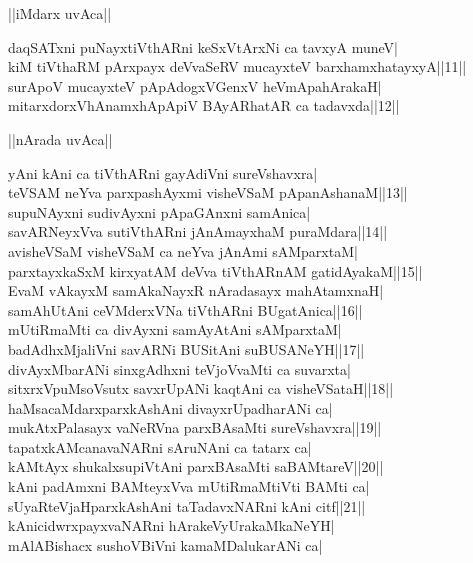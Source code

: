 \documentclass{article}
\begin{document}
\begin{center}
||iMdarx uvAca||
\end{center}

daqSATxni puNayxtiVthARni keSxVtArxNi ca tavxyA muneV|\\
kiM tiVthaRM pArxpayx deVvaSeRV mucayxteV barxhamxhatayxyA||11||\\
surApoV mucayxteV pApAdogxVGenxV heVmApahArakaH|\\
mitarxdorxVhAnamxhApApiV BAyARhatAR ca tadavxda||12||\\

\begin{center}
||nArada uvAca||
\end{center}

yAni kAni ca tiVthARni gayAdiVni sureVshavxra|\\
teVSAM neYva parxpashAyxmi visheVSaM pApanAshanaM||13||\\
supuNAyxni sudivAyxni pApaGAnxni samAnica|\\
savARNeyxVva sutiVthARni jAnAmayxhaM puraMdara||14||\\
avisheVSaM visheVSaM ca neYva jAnAmi sAMparxtaM|\\
parxtayxkaSxM kirxyatAM deVva tiVthARnAM gatidAyakaM||15||\\
EvaM vAkayxM samAkaNayxR nAradasayx mahAtamxnaH|\\
samAhUtAni ceVMderxVNa tiVthARni BUgatAnica||16||\\
mUtiRmaMti ca divAyxni samAyAtAni sAMparxtaM|\\
badAdhxMjaliVni savARNi BUSitAni suBUSANeYH||17||\\
divAyxMbarANi sinxgAdhxni teVjoVvaMti ca suvarxta|\\
sitxrxVpuMsoVsutx savxrUpANi kaqtAni ca visheVSataH||18||\\
haMsacaMdarxparxkAshAni divayxrUpadharANi ca|\\
mukAtxPalasayx vaNeRVna parxBAsaMti sureVshavxra||19||\\
tapatxkAMcanavaNARni sAruNAni ca tatarx ca|\\
kAMtAyx shukalxsupiVtAni parxBAsaMti saBAMtareV||20||\\
kAni padAmxni BAMteyxVva mUtiRmaMtiVti BAMti ca|\\
sUyaRteVjaHparxkAshAni taTadavxNARni kAni citf||21||\\
kAnicidwrxpayxvaNARni hArakeVyUrakaMkaNeYH|\\
mAlABishacx sushoVBiVni kamaMDalukarANi ca|\\
\end{document}
